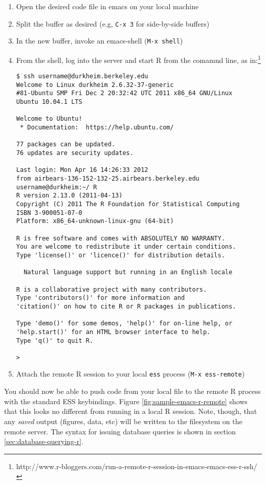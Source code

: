 \documentclass[11pt]{article}
\begin{document}
\begin{enumerate}
\item Open the desired code file in emacs on your local machine
\item Split the buffer as desired (e.g, \texttt{C-x 3} for
  side-by-side buffers)
\item In the new buffer, invoke an emacs-shell (\texttt{M-x shell})
\item From the shell, log into the server and start R from the comamnd
  line, as in:\footnote{http://www.r-bloggers.com/run-a-remote-r-session-in-emacs-emacs-ess-r-ssh/}
\begin{verbatim}
$ ssh username@durkheim.berkeley.edu
Welcome to Linux durkheim 2.6.32-37-generic 
#81-Ubuntu SMP Fri Dec 2 20:32:42 UTC 2011 x86_64 GNU/Linux
Ubuntu 10.04.1 LTS

Welcome to Ubuntu!
 * Documentation:  https://help.ubuntu.com/

77 packages can be updated.
76 updates are security updates.

Last login: Mon Apr 16 14:26:33 2012 
from airbears-136-152-132-25.airbears.berkeley.edu
username@durkheim:~/ R
R version 2.13.0 (2011-04-13)
Copyright (C) 2011 The R Foundation for Statistical Computing
ISBN 3-900051-07-0
Platform: x86_64-unknown-linux-gnu (64-bit)

R is free software and comes with ABSOLUTELY NO WARRANTY.
You are welcome to redistribute it under certain conditions.
Type 'license()' or 'licence()' for distribution details.

  Natural language support but running in an English locale

R is a collaborative project with many contributors.
Type 'contributors()' for more information and
'citation()' on how to cite R or R packages in publications.

Type 'demo()' for some demos, 'help()' for on-line help, or
'help.start()' for an HTML browser interface to help.
Type 'q()' to quit R.

> 
\end{verbatim}
\item Attach the remote R session to your local \texttt{ess} process
  (\texttt{M-x ess-remote})
\end{enumerate}

You should now be able to push code from your local file to the remote
R process with the standard ESS keybindings. Figure
\ref{fig:sample-emacs-r-remote} shows that this looks no different
from running in a local R session. Note, though, that any
\textit{saved} output (figures, data, etc) will be written to the
filesystem on the remote server. The syntax for issuing database
queries is shown in section \ref{sec:database-querying-r}. 
\end{document}
